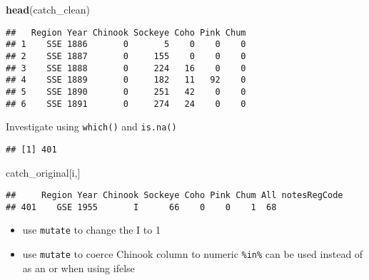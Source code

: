 \documentclass[]{article}
\newenvironment{Shaded}{\begin{snugshade}}{\end{snugshade}}
\newcommand{\CommentTok}[1]{\textcolor[rgb]{0.56,0.35,0.01}{\textit{#1}}}
\newcommand{\DataTypeTok}[1]{\textcolor[rgb]{0.13,0.29,0.53}{#1}}
\newcommand{\DecValTok}[1]{\textcolor[rgb]{0.00,0.00,0.81}{#1}}
\newcommand{\KeywordTok}[1]{\textcolor[rgb]{0.13,0.29,0.53}{\textbf{#1}}}
\newcommand{\NormalTok}[1]{#1}
\newcommand{\OperatorTok}[1]{\textcolor[rgb]{0.81,0.36,0.00}{\textbf{#1}}}
\newcommand{\StringTok}[1]{\textcolor[rgb]{0.31,0.60,0.02}{#1}}
\providecommand{\tightlist}{%
  \setlength{\itemsep}{0pt}\setlength{\parskip}{0pt}}
\begin{document}
\begin{Shaded}
\begin{Highlighting}[]
\KeywordTok{head}\NormalTok{(catch_clean)}
\end{Highlighting}
\end{Shaded}

\begin{verbatim}
##   Region Year Chinook Sockeye Coho Pink Chum
## 1    SSE 1886       0       5    0    0    0
## 2    SSE 1887       0     155    0    0    0
## 3    SSE 1888       0     224   16    0    0
## 4    SSE 1889       0     182   11   92    0
## 5    SSE 1890       0     251   42    0    0
## 6    SSE 1891       0     274   24    0    0
\end{verbatim}

Investigate using \texttt{which()} and \texttt{is.na()}

\begin{Shaded}
\end{Shaded}

\begin{verbatim}
## [1] 401
\end{verbatim}

\begin{Shaded}
\begin{Highlighting}[]
\NormalTok{catch_original[i,]}
\end{Highlighting}
\end{Shaded}

\begin{verbatim}
##     Region Year Chinook Sockeye Coho Pink Chum All notesRegCode
## 401    GSE 1955       I      66    0    0    1  68
\end{verbatim}

\begin{itemize}
\tightlist
\item
  use \texttt{mutate} to change the I to 1
\item
  use \texttt{mutate} to coerce Chinook column to numeric
  \texttt{\%in\%} can be used instead of \texttt{\textbar{}} as an or
  when using ifelse
\end{itemize}

\begin{Shaded}
\end{Shaded}
\end{document}
